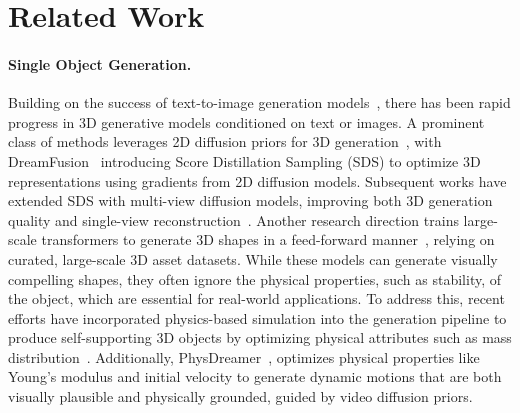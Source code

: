 \section{Related Work}

\paragraph{Single Object Generation.}
Building on the success of text-to-image generation models~\cite{rombach2022high,ramesh2022hierarchical,kang2023scaling,yu2022scaling}, there has been rapid progress in 3D generative models conditioned on text or images. A prominent class of methods leverages 2D diffusion priors for 3D generation~\cite{poole2022dreamfusion,wang2023score,lin2023magic3d,chen2023fantasia3d,metzer2023latent,wang2024prolificdreamer,sun2023dreamcraft3d,long2023wonder3d,michel2022text2mesh}, with DreamFusion~\cite{poole2022dreamfusion} introducing Score Distillation Sampling (SDS) to optimize 3D representations using gradients from 2D diffusion models.
Subsequent works have extended SDS with multi-view diffusion models, improving both 3D generation quality and single-view reconstruction~\cite{liu2023zero123,wang2023imagedream,shi2023mvdream,liu2023one2345,zhou2023sparsefusion,liu2023one2345++,long2023wonder3d,shi2023zero123++,liu2023syncdreamer}. Another research direction trains large-scale transformers to generate 3D shapes in a feed-forward manner~\cite{hong2023lrm,li2023instant3d,xu2023dmv3d,TripoSR2024}, relying on curated, large-scale 3D asset datasets.
While these models can generate visually compelling shapes, they often ignore the physical properties, such as stability, of the object, which are essential for real-world applications. To address this, recent efforts have incorporated physics-based simulation into the generation pipeline to produce self-supporting 3D objects by optimizing physical attributes such as mass distribution~\cite{guo2024physically,chen2024atlas3d,yan2024phycage,cai2024gaussian}. Additionally, PhysDreamer~\cite{zhang2024physdreamer}, optimizes physical properties like Young's modulus and initial velocity to generate dynamic motions that are both visually plausible and physically grounded, guided by video diffusion priors.


